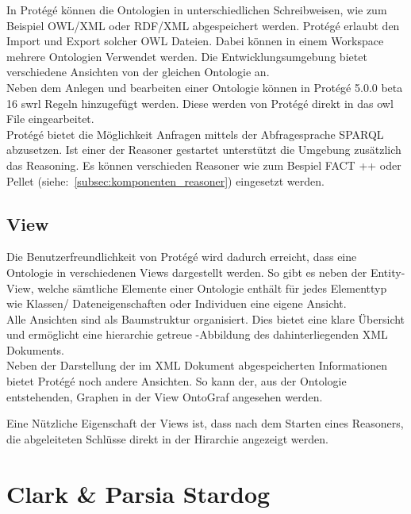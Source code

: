 In Protégé können die Ontologien in unterschiedlichen Schreibweisen, wie zum Beispiel OWL/XML oder RDF/XML abgespeichert werden. Protégé erlaubt den Import und Export solcher OWL Dateien. Dabei können in einem Workspace mehrere Ontologien Verwendet werden. Die Entwicklungsumgebung bietet verschiedene Ansichten von der gleichen Ontologie an. \\
Neben dem Anlegen und bearbeiten einer Ontologie können in Protégé 5.0.0 beta 16 swrl Regeln hinzugefügt werden. Diese werden von Protégé direkt in das owl File eingearbeitet. \\
Protégé bietet die Möglichkeit Anfragen mittels der Abfragesprache SPARQL abzusetzen. Ist einer der Reasoner gestartet unterstützt die Umgebung zusätzlich das Reasoning. Es können verschieden Reasoner wie zum Bespiel FACT ++ oder Pellet (siehe:~\ref{subsec:komponenten_reasoner}) eingesetzt werden.\cite{protegeFeatures} 


\subsection{View}
\label{subsec:komponenten_protege_view}

Die Benutzerfreundlichkeit von Protégé wird dadurch erreicht, dass eine Ontologie in verschiedenen Views dargestellt werden. So gibt es neben der Entity-View, welche sämtliche Elemente einer Ontologie enthält für jedes Elementtyp wie Klassen/ Dateneigenschaften oder Individuen eine eigene Ansicht.\\
Alle Ansichten sind als Baumstruktur organisiert. Dies bietet eine klare Übersicht und ermöglicht eine hierarchie getreue -Abbildung des dahinterliegenden XML Dokuments.\\ 
Neben der Darstellung der im XML Dokument abgespeicherten Informationen bietet Protégé noch andere Ansichten. So kann der, aus der Ontologie entstehenden, Graphen in der View OntoGraf angesehen werden.\cite{protegeView}

Eine Nützliche Eigenschaft der Views ist, dass nach dem Starten eines Reasoners, die abgeleiteten Schlüsse direkt in der Hirarchie angezeigt werden.

\section{Clark \& Parsia Stardog}
\label{sec:komponenten_stardog}


